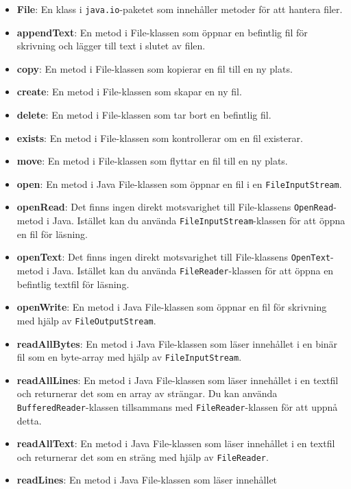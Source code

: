 \begin{itemize}
\tightlist
\item
  \textbf{File}: En klass i \texttt{java.io}-paketet som innehåller
  metoder för att hantera filer.
\item
  \textbf{appendText}: En metod i File-klassen som öppnar en befintlig
  fil för skrivning och lägger till text i slutet av filen.
\item
  \textbf{copy}: En metod i File-klassen som kopierar en fil till en ny
  plats.
\item
  \textbf{create}: En metod i File-klassen som skapar en ny fil.
\item
  \textbf{delete}: En metod i File-klassen som tar bort en befintlig
  fil.
\item
  \textbf{exists}: En metod i File-klassen som kontrollerar om en fil
  existerar.
\item
  \textbf{move}: En metod i File-klassen som flyttar en fil till en ny
  plats.
\item
  \textbf{open}: En metod i Java File-klassen som öppnar en fil i en
  \texttt{FileInputStream}.
\item
  \textbf{openRead}: Det finns ingen direkt motsvarighet till
  File-klassens \texttt{OpenRead}-metod i Java. Istället kan du använda
  \texttt{FileInputStream}-klassen för att öppna en fil för läsning.
\item
  \textbf{openText}: Det finns ingen direkt motsvarighet till
  File-klassens \texttt{OpenText}-metod i Java. Istället kan du använda
  \texttt{FileReader}-klassen för att öppna en befintlig textfil för
  läsning.
\item
  \textbf{openWrite}: En metod i Java File-klassen som öppnar en fil för
  skrivning med hjälp av \texttt{FileOutputStream}.
\item
  \textbf{readAllBytes}: En metod i Java File-klassen som läser
  innehållet i en binär fil som en byte-array med hjälp av
  \texttt{FileInputStream}.
\item
  \textbf{readAllLines}: En metod i Java File-klassen som läser
  innehållet i en textfil och returnerar det som en array av strängar.
  Du kan använda \texttt{BufferedReader}-klassen tillsammans med
  \texttt{FileReader}-klassen för att uppnå detta.
\item
  \textbf{readAllText}: En metod i Java File-klassen som läser
  innehållet i en textfil och returnerar det som en sträng med hjälp av
  \texttt{FileReader}.
\item
  \textbf{readLines}: En metod i Java File-klassen som läser innehållet

\end{itemize}
